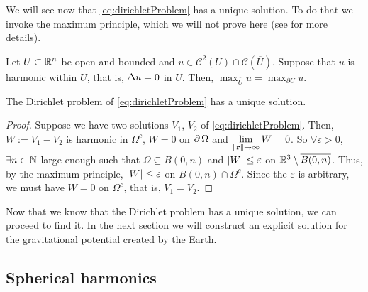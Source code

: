 \documentclass[../main.tex]{subfiles}
\begin{document}
We will see now that \cref{eq:dirichletProblem} has a unique solution. To do that we invoke the maximum principle, which we will not prove here (see \cite{evans} for more details).
\begin{theorem}
  Let $U\subset \mathbb{R}^n$ be open and bounded and $u\in\mathcal{C}^2(U)\cap \mathcal{C}(\overline{U})$. Suppose that $u$ is harmonic within $U$, that is, $\Delta u=0$ in $U$. Then, $\max_{\overline{U}}u=\max_{\partial U}u$.
\end{theorem}
\begin{corollary}
  The Dirichlet problem of \cref{eq:dirichletProblem} has a unique solution.
\end{corollary}
\begin{proof}
  Suppose we have two solutions $V_1$, $V_2$ of \cref{eq:dirichletProblem}. Then, $W:=V_1-V_2$ is harmonic in $\Omega^c$, $W=0$ on $\operatorname{\partial}{\Omega}$ and $\displaystyle\lim_{\left\|\boldsymbol{\mathrm{r}}\right\|\to\infty}W=0$. So $\forall\varepsilon>0$, $\exists n\in\mathbb{N}$ large enough such that $\Omega \subseteq B(0,n)$ and $\abs{W}\leq \varepsilon$ on $\mathbb{R}^3\setminus \overline{B(0,n)}$. Thus, by the maximum principle, $\abs{W}\leq \varepsilon$ on $\overline{B(0,n)}\cap \Omega^c$. Since the $\varepsilon$ is arbitrary, we must have $W=0$ on $\Omega^c$, that is, $V_1=V_2$.
\end{proof}
Now that we know that the Dirichlet problem has a unique solution, we can proceed to find it. In the next section we will construct an explicit solution for the gravitational potential created by the Earth.
\subsection{Spherical harmonics}
\end{document}
